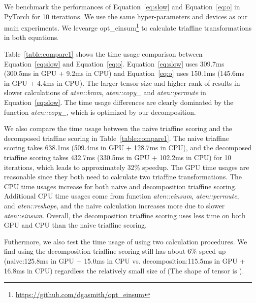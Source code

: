 \documentclass[11pt]{article}
\begin{document}
We benchmark the performances of Equation~\ref{eq:slow} and Equation~\ref{eq:o} in PyTorch for 10 iterations.
We use the same hyper-parameters and devices as our main experiments.
We levearge opt\_einsum\footnote{\url{https://github.com/dgasmith/opt_einsum}} to calculate triaffine transformations in both equations.

Table~\ref{table:compare1} shows the time usage comparison between Equation~\ref{eq:slow} and Equation~\ref{eq:o}.
Equation~\ref{eq:slow} uses 309.7ms (300.5ms in GPU + 9.2ms in CPU) and Equation~\ref{eq:o} uses 150.1ms (145.6ms in GPU + 4.4ms in CPU).
The larger tensor size and higher rank of  results in slower calculations of \textit{aten::bmm}, \textit{aten::copy\_} and \textit{aten::permute} in Equation~\ref{eq:slow}.
The time usage differences are clearly dominated by the function \textit{aten::copy\_}, which is optimized by our decomposition.

We also compare the time usage between the naive triaffine scoring and the decomposed triaffine scoring in Table~\ref{table:compare1}.
The naive triaffine scoring takes 638.1ms (509.4ms in GPU + 128.7ms in CPU), and the decomposed triaffine scoring takes 432.7ms (330.5ms in GPU + 102.2ms in CPU) for 10 iterations, which leads to approximately 32\% speedup.
The GPU time usages are reasonable since they both need to calculate two triaffine transformations.
The CPU time usages increase for both naive and decomposition triaffine scoring.
Additional CPU time usages come from function \textit{aten::einsum}, \textit{aten::permute}, and \textit{aten::reshape}, and the naive calculation increases more due to slower \textit{aten::einsum}.
Overall, the decomposition triaffine scoring uses less time on both GPU and CPU than the naive triaffine scoring.

Futhermore, we also test the time usage of  using two calculation procedures. We find using the decomposition triaffine scoring still has about 6\% speed up (naive:125.8ms in GPU + 15.0ms in CPU vs. decomposition:115.5ms in GPU + 16.8ms in CPU) regardless the relatively small size of  (The shape of tensor  is ).
\end{document}
